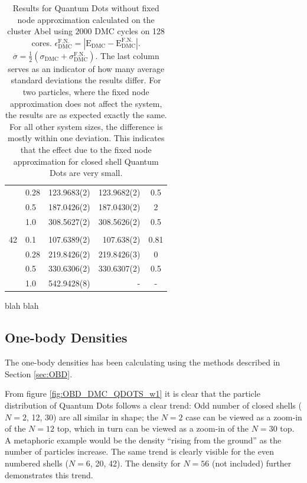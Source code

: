 \begin{table}
\begin{center}
\begin{tabular}{rl|rrc}
          &   0.28   & 123.9683(2) & 123.9682(2)& 0.5 \\
          &   0.5    & 187.0426(2) & 187.0430(2)& 2 \\
          &   1.0    & 308.5627(2) & 308.5626(2)& 0.5 \\
\cline{2-5}
\multicolumn{5}{c}{} \\
    42    &   0.1    & 107.6389(2) & 107.638(2) & 0.81 \\
          &   0.28   & 219.8426(2) & 219.8426(3)& 0 \\
          &   0.5    & 330.6306(2) & 330.6307(2)& 0.5 \\
          &   1.0    & 542.9428(8) &    -       & - \\
\hline\hline
\end{tabular}
\caption{Results for Quantum Dots without fixed node approximation calculated on the cluster Abel using $2000$ DMC cycles on 128 cores. $\epsilon_\mathrm{DMC}^\mathrm{F.N.} = |\mathrm{E_{DMC}} - \mathrm{E_{DMC}^{F.N.}}|$. $\overline{\sigma}  = \frac{1}{2}(\sigma_\mathrm{DMC} + \sigma_\mathrm{DMC}^\mathrm{F.N.})$. The last column serves as an indicator of how many average standard deviations the results differ. For two particles, where the fixed node approximation does not affect the system, the results are as expected exactly the same. For all other system sizes, the difference is mostly within one deviation. This indicates that the effect due to the fixed node approximation for closed shell Quantum Dots are very small.}
\end{center}
\end{table}

blah blah

\clearpage

\subsection{One-body Densities}

The one-body densities has been calculating using the methods described in Section \ref{sec:OBD}.

From figure \ref{fig:OBD_DMC_QDOTS_w1} it is clear that the particle distribution of Quantum Dots follows a clear trend: Odd number of closed shells ($N=2$, 12, 30) are all similar in shape; the $N=2$ case can be viewed as a zoom-in of the $N=12$ top, which in turn can be viewed as a zoom-in of the $N=30$ top. A metaphoric example would be the density ``rising from the ground'' as the number of particles increase. The same trend is clearly visible for the even numbered shells ($N=6$, 20, 42). The density for $N=56$ (not included) further demonstrates this trend.

